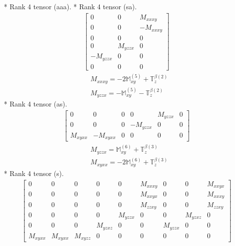 \documentclass[fleqn,8pt,landscape]{jsarticle}
\begin{document}
* Rank 4 tensor (aaa).
* Rank 4 tensor (sa).
\begin{align*}
\begin{bmatrix} 0 & 0 & M_{xxxy} \\ 0 & 0 & - M_{xxxy} \\ 0 & 0 & 0 \\ 0 & M_{yzzx} & 0 \\ - M_{yzzx} & 0 & 0 \\ 0 & 0 & 0 \end{bmatrix}
\end{align*}
\begin{align*}
& M_{xxxy} = - 2 \mathbb{M}_{xy}^{(5)} + \mathbb{T}_{z}^{\beta(2)} \\
& M_{yzzx} = - \mathbb{M}_{xy}^{(5)} - \mathbb{T}_{z}^{\beta(2)}
\end{align*}
* Rank 4 tensor (as).
\begin{align*}
\begin{bmatrix} 0 & 0 & 0 & 0 & M_{yzzx} & 0 \\ 0 & 0 & 0 & - M_{yzzx} & 0 & 0 \\ M_{xyxx} & - M_{xyxx} & 0 & 0 & 0 & 0 \end{bmatrix}
\end{align*}
\begin{align*}
& M_{yzzx} = \mathbb{M}_{xy}^{(6)} + \mathbb{T}_{z}^{\beta(3)} \\
& M_{xyxx} = - 2 \mathbb{M}_{xy}^{(6)} + \mathbb{T}_{z}^{\beta(3)}
\end{align*}
* Rank 4 tensor (s).
\begin{align*}
\begin{bmatrix} 0 & 0 & 0 & 0 & 0 & M_{xxxy} & 0 & 0 & M_{xxyx} \\ 0 & 0 & 0 & 0 & 0 & M_{xxyx} & 0 & 0 & M_{xxxy} \\ 0 & 0 & 0 & 0 & 0 & M_{zzxy} & 0 & 0 & M_{zzxy} \\ 0 & 0 & 0 & 0 & M_{yzzx} & 0 & 0 & M_{yzxz} & 0 \\ 0 & 0 & 0 & M_{yzxz} & 0 & 0 & M_{yzzx} & 0 & 0 \\ M_{xyxx} & M_{xyxx} & M_{xyzz} & 0 & 0 & 0 & 0 & 0 & 0 \end{bmatrix}
\end{align*}
\end{document}
